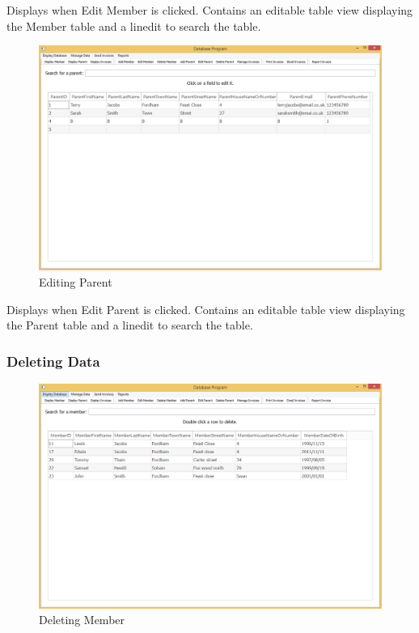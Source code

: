 Displays when Edit Member is clicked. Contains an editable table view displaying the Member table and a linedit to search the table.

\begin{figure}[H]
\includegraphics[width=\textwidth]{./Maintenance/Images/EditParent.png}
    \caption{Editing Parent} \label{fig:edit_parent}
\end{figure}

Displays when Edit Parent is clicked. Contains an editable table view displaying the Parent table and a linedit to search the table.

\subsubsection{Deleting Data}
\begin{figure}[H]
\includegraphics[width=\textwidth]{./Maintenance/Images/DeleteMember.png}
    \caption{Deleting Member} \label{fig:delete_member}
\end{figure}

